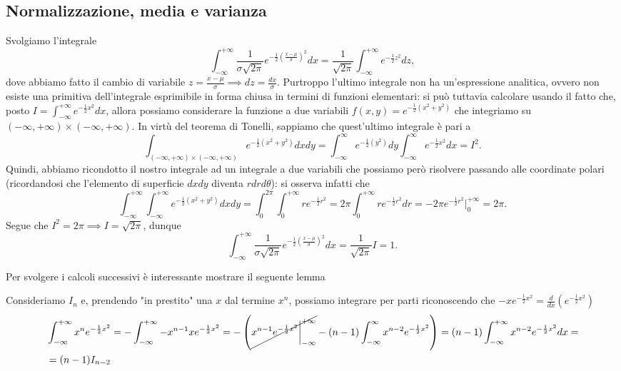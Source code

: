 \documentclass{report}
\begin{document}
\subsection{Normalizzazione, media e varianza}
\begin{myproof}
	Svolgiamo l'integrale
	$$
	\int_{-\infty}^{+\infty} \frac{1}{\sigma \sqrt{2\pi}} e^{-\frac{1}{2}(\frac{x-\mu}{\sigma})^2}dx = \frac{1}{\sqrt{2\pi}} \int_{-\infty}^{+\infty} e^{-\frac{1}{2}z^2} dz, 
	$$
	dove abbiamo fatto il cambio di variabile $z = \frac{x - \mu}{\sigma} \implies dz = \frac{dx}{\sigma}$. Purtroppo l'ultimo integrale non ha un'espressione analitica, ovvero non esiste una primitiva dell'integrale esprimibile in forma chiusa in termini di funzioni elementari: si può tuttavia calcolare usando il fatto che, posto $I = \int_{-\infty}^{+\infty} e^{-\frac{1}{2}x^2} dx$, allora possiamo considerare la funzione a due variabili $f(x, y) = e^{-\frac{1}{2}(x^2 + y^2)}$ che integriamo su $(-\infty, +\infty) \times (-\infty, +\infty)$. In virtù del teorema di Tonelli, sappiamo che quest'ultimo integrale è pari a
	$$
		\int_{(-\infty, +\infty) \times (-\infty, +\infty)} e^{-\frac{1}{2}(x^2+y^2)} dxdy = \int_{-\infty}^{\infty} e^{-\frac{1}{2}(y^2)} dy \int_{-\infty}^{\infty} e^{-\frac{1}{2}x^2} dx = I^2.
	$$
	Quindi, abbiamo ricondotto il nostro integrale ad un integrale a due variabili che possiamo però risolvere passando alle coordinate polari (ricordandosi che l'elemento di superficie $dxdy$ diventa $rdrd\theta$): si osserva infatti che
	$$
	\int_{-\infty}^{+\infty} \int_{-\infty}^{+\infty} e^{-\frac{1}{2}(x^2 + y^2)}dxdy = \int_0^{2 \pi} \int_0^{+\infty} re^{-\frac{1}{2}r^2} = 2 \pi \int_0^{+\infty} re^{-\frac{1}{2}r^2}dr = - 2 \pi e^{-\frac{1}{2}r^2}\bigg|^{+\infty}_0  = 2 \pi.
	$$
	Segue che $I^2 = 2 \pi \implies I = \sqrt{2 \pi}$, dunque
	$$
	\int_{-\infty}^{+\infty} \frac{1}{\sigma \sqrt{2 \pi}}e^{-\frac{1}{2}(\frac{x-\mu}{\sigma})^2} dx = \frac{1}{\sqrt{2 \pi}} I = 1.
	$$
\end{myproof}
Per svolgere i calcoli successivi è interessante mostrare il seguente lemma
\begin{myproof}
	Consideriamo $I_n$ e, prendendo "in prestito" una $x$ dal termine $x^n$, possiamo integrare per parti riconoscendo che $-xe^{-\frac{1}{2}x^2} = \frac{d}{dx}(e^{-\frac{1}{2}x^2})$
	\begin{align*}
		&\int_{-\infty}^{+\infty} x^n e^{-\frac{1}{2}x^2} = - \int_{-\infty}^{+\infty} -x^{n-1} xe^{-\frac{1}{2}x^2} = - \left( \cancel{x^{n-1}e^{-\frac{1}{2}x^2}\bigg|^{+\infty}_{-\infty}} - (n-1)\int_{-\infty}^{\infty} x^{n-2} e^{-\frac{1}{2}x^2} \right) = (n-1)\int_{-\infty}^{+\infty} x^{n-2}e^{-\frac{1}{2}x^2} dx = \\
		&=(n-1)I_{n-2}
	\end{align*}
\end{myproof}
\end{document}
